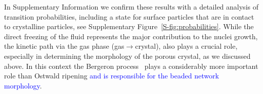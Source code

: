 \documentclass[preprint,amsmath,amssymb,superscriptaddress]{revtex4-1}
\begin{document}
In Supplementary Information we confirm these results with a detailed analysis of transition probabilities, including a state for surface particles that are in contact 
to crystalline particles, see Supplementary Figure~\ref{S-fig:probabilities}.
While the direct freezing of the fluid represents the major contribution to the nuclei growth, the kinetic path via the gas phase (gas$\rightarrow$crystal), also plays a crucial role,
especially in determining the morphology of the porous crystal, as we discussed above. In this context the Bergeron process~\cite{glickman2000glossary,morrison2012resilience}
plays a considerably more important role than Ostwald ripening \textcolor{blue}{and is responsible for the beaded network morphology}.

% 
\end{document}
